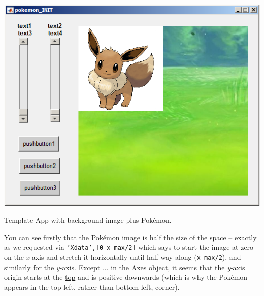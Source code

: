 \documentclass{tufte-book} %
\begin{document}
\begin{marginfigure}[0.0in]
\includegraphics[width=\linewidth]{chGUI-pokemon3.png}
\caption{Template App with background image plus Pok\'emon.}
\label{fig:chGUI-pokemon3}
\end{marginfigure}

You can see firstly that the Pok\'emon image is  half the size of the space -- exactly as we requested via \texttt{\textcolor[rgb]{0.501961,0,1}{'Xdata'},[0 x\_max/2]} which says to start the image at zero on the \textit{x}-axis and stretch it horizontally until half way along (\texttt{x\_max/2}), and similarly for the \textit{y}-axis. Except ... in the \textsf{Axes} object, it seems that the \textit{y}-axis origin starts at the \uline{top} and is positive downwards (which is why the Pok\'emon appears in the top left, rather than bottom left, corner).
\end{document}
